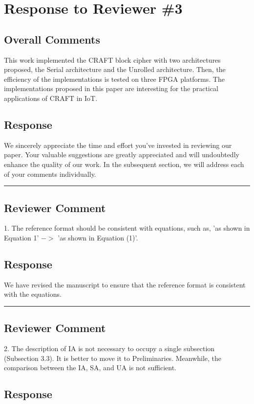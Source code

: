 \section{Response to Reviewer \#3}
\subsection*{Overall Comments}
This work implemented the CRAFT block cipher with two architectures proposed, the Serial architecture and the Unrolled architecture. Then, the efficiency of the implementations is tested on three FPGA platforms. The implementations proposed in this paper are interesting for the practical applications of CRAFT in IoT.

\subsection{Response}

We sincerely appreciate the time and effort you've invested in reviewing our paper. Your valuable suggestions are greatly appreciated and will undoubtedly enhance the quality of our work. In the subsequent section, we will address each of your comments individually.

\noindent\rule{\linewidth}{2.0pt}

\subsection{Reviewer Comment}
1. The reference format should be consistent with equations, such as, 'as shown in Equation 1' $->$ 'as shown in Equation (1)'.

\subsection{Response}

We have revised the manuscript to ensure that the reference format is consistent with the equations.


\noindent\rule{\linewidth}{2.0pt}

\subsection{Reviewer Comment}
2. The description of IA is not necessary to occupy a single subsection (Subsection 3.3). It is better to move it to Preliminaries. Meanwhile, the comparison between the IA, SA, and UA is not sufficient.

\subsection{Response}

